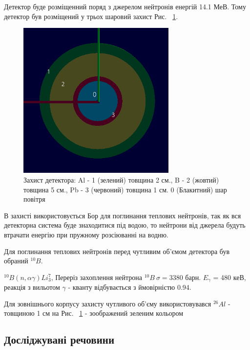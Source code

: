 \documentclass[a4paper, 14pt]{article}
\numberwithin{equation}{section}
\numberwithin{table}{section}
\begin{document}
Детектор буде розміщенний поряд з джерелом нейтронів енергій 14.1 МеВ. Тому детектор був розміщений у трьох шаровий захист Рис. ~\ref{ris:s_detector_P}.
\begin{figure}[hbt!]
	\centering \includegraphics[width=0.7\textwidth]{images/dectorPrt.png}
	\caption{Захист детектора: Al - 1 (зелений) товщина 2 см., B - 2 (жовтий) товщина 5 см., Pb - 3 (червоний) товщина 1 см. 0 (Блакитний) шар повітря} 
	\label{ris:s_detector_P}	
\end{figure} 
В захисті використовується Бор для поглинання теплових нейтронів, так як вся детекторна система буде знаходитися під водою, то нейтрони від джерела будуть втрачати енергію при пружному розсіюванні на водню. 

Для поглинання теплових нейтронів перед чутливим об'ємом детектора був обраний $^{10}B$.  

$^{10}B ( n, \alpha \gamma)Li_3^7$, Переріз захоплення нейтрона $^{10}B \ \sigma = 3380$ барн.
$E_\gamma$ = 480 кеВ, реакція з вильотом $\gamma$ - кванту відбувається з ймовірністю 0.94.

Для зовнішнього корпусу захисту чутливого об'єму використовувався $^{26}Al$ - товщиною 1 см на Рис. ~\ref{ris:s_detector_P} - зоображений зеленим кольором 

\subsection{Досліджувані речовини} 
\end{document}
